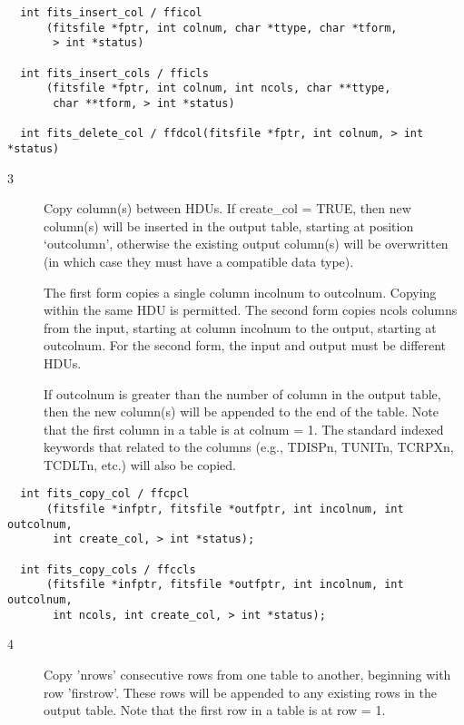 \documentclass[11pt]{book}
\begin{document}
\begin{verbatim}
  int fits_insert_col / fficol
      (fitsfile *fptr, int colnum, char *ttype, char *tform,
       > int *status)

  int fits_insert_cols / fficls
      (fitsfile *fptr, int colnum, int ncols, char **ttype,
       char **tform, > int *status)

  int fits_delete_col / ffdcol(fitsfile *fptr, int colnum, > int *status)
\end{verbatim}

\begin{description}
\item[3 ] Copy column(s) between HDUs.  If create\_col = TRUE, then
    new column(s) will be inserted in the output table, starting at
    position `outcolumn', otherwise the existing output column(s) will
    be overwritten (in which case they must have a compatible data
    type).

    The first form copies a single column incolnum to outcolnum.
    Copying within the same HDU is permitted.  The second form copies
    ncols columns from the input, starting at column incolnum to the
    output, starting at outcolnum.  For the second form, the input and
    output must be different HDUs.

    If outcolnum is greater than the number of column in the output table, then
    the new column(s) will be appended to the end of the table.
    Note that the first column in a table is at colnum = 1.
    The standard indexed keywords that related to the columns (e.g., TDISPn,
    TUNITn, TCRPXn, TCDLTn, etc.) will also be copied. \label{ffcpcl} \label{ffccls}
\end{description}

\begin{verbatim}
  int fits_copy_col / ffcpcl
      (fitsfile *infptr, fitsfile *outfptr, int incolnum, int outcolnum,
       int create_col, > int *status);

  int fits_copy_cols / ffccls
      (fitsfile *infptr, fitsfile *outfptr, int incolnum, int outcolnum, 
       int ncols, int create_col, > int *status);
\end{verbatim}

\begin{description}
\item[4 ] Copy 'nrows' consecutive rows from one table to another, beginning
    with row 'firstrow'.  These rows will be appended to any existing
    rows in the output table.
   Note that the first row in a table is at row = 1. 
   \label{ffcprw}
\end{description}
\end{document}
